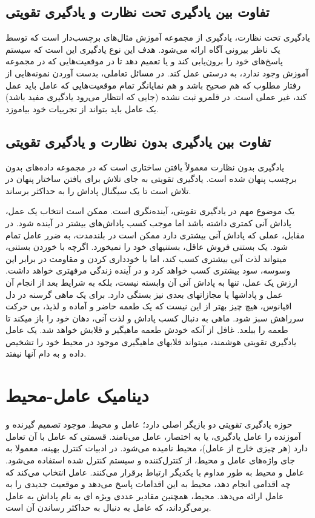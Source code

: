 \subsection*{تفاوت بین یادگیری تحت نظارت و یادگیری تقویتی}
یادگیری تحت نظارت، یادگیری از مجموعه آموزش مثال‌های برچسب‌دار است که توسط یک ناظر بیرونی آگاه ارائه می‌شود. هدف این نوع یادگیری این است که سیستم پاسخ‌های خود را برون‌یابی کند و یا تعمیم دهد تا در موقعیت‌هایی که در مجموعه آموزش وجود ندارد، به درستی عمل کند. در مسائل تعاملی، بدست آوردن نمونه‌هایی از رفتار مطلوب که هم صحیح باشد و هم نمایانگر تمام موقعیت‌هایی که عامل باید عمل کند، غیر عملی است. در قلمرو ثبت نشده (جایی که انتظار می‌رود یادگیری مفید باشد) یک عامل باید بتواند از تجربیات خود بیاموزد.

\subsection*{تفاوت بین یادگیری بدون نظارت و یادگیری تقویتی}
یادگیری بدون نظارت معمولاً یافتن ساختاری است که در مجموعه داده‌های بدون برچسب پنهان شده است. یادگیری تقویتی به جای تلاش برای یافتن ساختار پنهان در تلاش است تا یک سیگنال پاداش را به حداکثر برساند.



یک موضوع مهم در یادگیری تقویتی، آینده‌نگری است. ممکن است انتخاب یک عمل، پاداش آنی کمتری داشته باشد اما موجب کسب پاداش‌های بیشتر در آینده شود. در مقابل، عملی که پاداش آنی بیشتری دارد ممکن است در بلند\nf مدت، به ضرر عامل تمام شود.  یک بستنی فروش عاقل، بستنی\nf های خود را نمی\nf خورد. اگرچه با خوردن بستنی، می\nf تواند لذت  آنی بیشتری کسب کند، اما با خودداری کردن و مقاومت در برابر این وسوسه، سود بیشتری کسب \nf خواهد کرد و در آینده زندگی مرفه\nf تری خواهد داشت.
ارزش یک عمل، تنها به پاداش آنی آن وابسته نیست، بلکه به شرایط بعد از انجام آن عمل و پاداش\nf ها یا مجازات\nf های بعدی نیز بستگی دارد. برای یک ماهی گرسنه در دل اقیانوس، هیچ چیز بهتر از این نیست که یک طعمه حاضر و آماده و لذیذ، بی حرکت سرراهش سبز شود. ماهی به دنبال کسب پاداش و لذت آنی، دهان خود را باز می\nf کند تا طعمه را ببلعد. غافل از آنکه خودش طعمه ماهیگیر و قلابش خواهد شد. یک عامل یادگیری تقویتی هوشمند، می\nf تواند قلاب\nf های ماهیگیری موجود در محیط خود را تشخیص داده و به دام آن\nf ها نیفتد.



\section{دینامیک عامل-محیط}
حوزه یادگیری تقویتی  دو بازیگر اصلی دارد؛ عامل و محیط. موجود تصمیم گیرنده و آموزنده را عامل یادگیری، یا به اختصار، عامل می‌نامند. قسمتی که عامل با آن تعامل دارد (هر چیزی خارج از عامل)، محیط نامیده می‌شود. در ادبیات کنترل بهینه، معمولا به جای واژه‌های عامل و محیط، از  کنترل‌کننده 
و سیستم کنترل شده  استفاده می‌شود.
عامل و محیط به طور مداوم با یکدیگر ارتباط برقرار می‌کنند. عامل انتخاب می‌کند که چه اقدامی‌ انجام دهد، محیط به این اقدامات پاسخ می‌دهد و موقعیت جدیدی را به عامل ارائه می‌دهد.
محیط، همچنین مقادیر عددی ویژه ای به نام پاداش  به عامل برمی‌گرداند، که عامل به دنبال به حداکثر رساندن آن است. 

